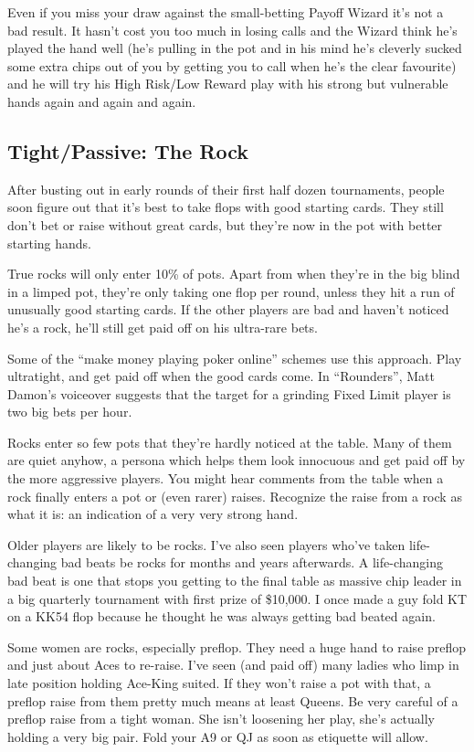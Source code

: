 Even if you miss your draw against the small-betting Payoff Wizard
it's not a bad result. It hasn't cost you too much in losing calls and
the Wizard think he's played the hand well (he's pulling in the pot and
in his mind he's cleverly sucked some extra chips out of you by
getting you to call when he's the clear favourite)
and he will try his High Risk/Low Reward play with his strong but
vulnerable hands again and again and again.

\subsection{Tight/Passive: The Rock}

After busting out in early rounds of their first half dozen
tournaments, people soon figure out that it's best to take flops
with good starting cards. They still don't bet or raise without
great cards, but they're now in the pot with better starting hands.

True rocks will only enter 10\% of pots. Apart from when they're
in the big blind in a limped pot, they're only taking one
flop per round, unless they hit a run of unusually good starting
cards. If the other players are bad and haven't noticed
he's a rock, he'll still get paid off on his ultra-rare bets.

Some of the ``make money playing poker online'' schemes use this
approach. Play ultratight, and get paid off when the good cards
come. In ``Rounders'', Matt Damon's voiceover suggests that
the target for a grinding Fixed Limit player is two big bets per
hour.

Rocks enter so few pots that they're hardly noticed
at the table. Many of them are quiet anyhow,
a persona which helps them look innocuous and get paid off by the
more aggressive players. You might hear comments from the table
when a rock finally enters a pot or (even rarer) raises. Recognize
the raise from a rock as what it is: an indication of a very very
strong hand.

Older players are likely to be rocks. I've also seen players who've
taken life-changing bad beats be rocks for months and years
afterwards. A life-changing bad beat is one that stops you getting to
the final table as massive chip leader in a big quarterly tournament
with first prize of \$10,000. I once made a guy fold KT on a KK54 flop
because he thought he was always getting bad beated again.

Some women are rocks, especially preflop. They
need a huge hand to raise preflop and just about Aces to
re-raise. I've seen (and paid off) many ladies who limp in late
position holding Ace-King suited. If they won't raise a pot with that,
a preflop raise from them pretty much means at least Queens. Be very
careful of a preflop raise from a tight woman. She isn't
loosening her play, she's actually holding a very
big pair. Fold your A9 or QJ as soon as etiquette will allow.

